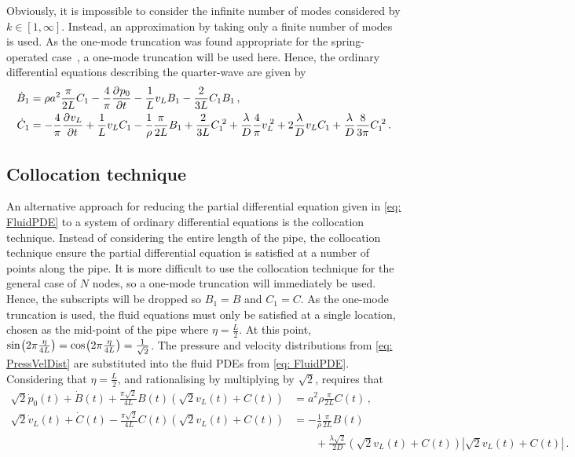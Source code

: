 Obviously, it is impossible to consider the infinite number of modes considered by $k \in [1,\infty]$. Instead, an approximation by taking only a finite number of modes is used. As the one-mode truncation was found appropriate for the spring-operated case~\cite{Hos2015ModelPipe}, a one-mode truncation will be used here. Hence, the ordinary differential equations describing the quarter-wave are given by
~
\begin{equation*}
\begin{split}
    \dot{B}_1 &= \rho a^2 \frac{\pi}{2 L} C_1 - \frac{4}{\pi} \pdiff{p_0}{t} - \frac{1}{L} v_L B_1 - \frac{2}{3L} C_1 B_1 \, ,
    \\
    \dot{C}_1 &= - \frac{4}{\pi} \pdiff{v_L}{t} + \frac{1}{L} v_L C_1 - \frac{1}{\rho} \frac{\pi}{2L} B_1 + \frac{2}{3L} C_1\power{2} + \frac{\lambda}{D} \frac{4}{\pi} v_L\power{2} + 2 \frac{\lambda}{D} v_L C_1 + \frac{\lambda}{D} \frac{8}{3 \pi} C_1\power{2} \, .
\end{split}
\end{equation*}

\subsection{Collocation technique}

An alternative approach for reducing the partial differential equation given in \cref{eq: FluidPDE} to a system of ordinary differential equations is the collocation technique. Instead of considering the entire length of the pipe, the collocation technique ensure the partial differential equation is satisfied at a number of points along the pipe. It is more difficult to use the collocation technique for the general case of $N$ nodes, so a one-mode truncation will immediately be used. Hence, the subscripts will be dropped so $B_1 = B$ and $C_1 = C$. As the one-mode truncation is used, the fluid equations must only be satisfied at a single location, chosen as the mid-point of the pipe where $\eta = \frac{L}{2}$.
%
At this point, $\fun{sin}{2 \pi \frac{\eta}{4L}} = \fun{cos}{2 \pi \frac{\eta}{4L}} = \frac{1}{\sqrt{2}}$.
%
The pressure and velocity distributions from \cref{eq: PressVelDist} are substituted into the fluid PDEs from \cref{eq: FluidPDE}. Considering that $\eta = \frac{L}{2}$, and rationalising by multiplying by $\sqrt{2}$, requires that
~
\begin{equation*}
\begin{split}
    \sqrt{2} \dot{p}_0(t) + \dot{B}(t) + \frac{\pi \sqrt{2}}{4 L} B(t) \left( \sqrt{2} v_L(t) + C(t) \right) &= a^2 \rho \frac{\pi}{2L} C(t) \, , \\
    \sqrt{2} \dot{v}_L(t) + \dot{C}(t) - \frac{\pi \sqrt{2}}{4 L} C(t) \left( \sqrt{2} v_L(t) + C(t) \right) &= - \frac{1}{\rho} \frac{\pi}{2 L} B(t) \\
    &\qquad + \frac{\lambda \sqrt{2}}{2D} \left( \sqrt{2} v_L(t) + C(t) \right) \left| \sqrt{2} v_L(t) + C(t) \right| \, .
\end{split}
\end{equation*}

